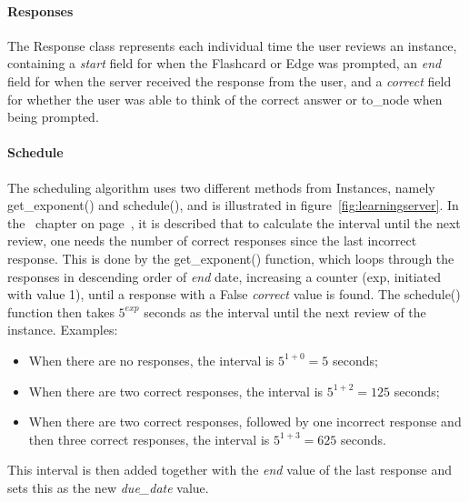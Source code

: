 \paragraph{Responses} The Response class represents each individual time the user reviews an instance, containing a \emph{start} field for when the Flashcard or Edge was prompted, an \emph{end} field for when the server received the response from the user, and a \emph{correct} field for whether the user was able to think of the correct answer or to\_node when being prompted.

\paragraph{Schedule} The scheduling algorithm uses two different methods from Instances, namely get\_exponent() and schedule(), and is illustrated in figure~\ref{fig:learningserver}. In the~ chapter on page~\pageref{ch:frameworks}, it is described that to calculate the interval until the next review, one needs the number of correct responses since the last incorrect response. This is done by the get\_exponent() function, which loops through the responses in descending order of \emph{end} date, increasing a counter (exp, initiated with value 1), until a response with a False \emph{correct} value is found. The schedule() function then takes $5^{exp}$ seconds as the interval until the next review of the instance. Examples:
%
\begin{itemize}
    \item When there are no responses, the interval is $5^{1+0}=5$ seconds;
        \item When there are two correct responses, the interval is $5^{1+2}=125$ seconds;
        \item When there are two correct responses, followed by one incorrect response and then three correct responses, the interval is $5^{1+3}=625$ seconds.
\end{itemize}
%
This interval is then added together with the \emph{end} value of the last response and sets this as the new \emph{due\_date} value.

